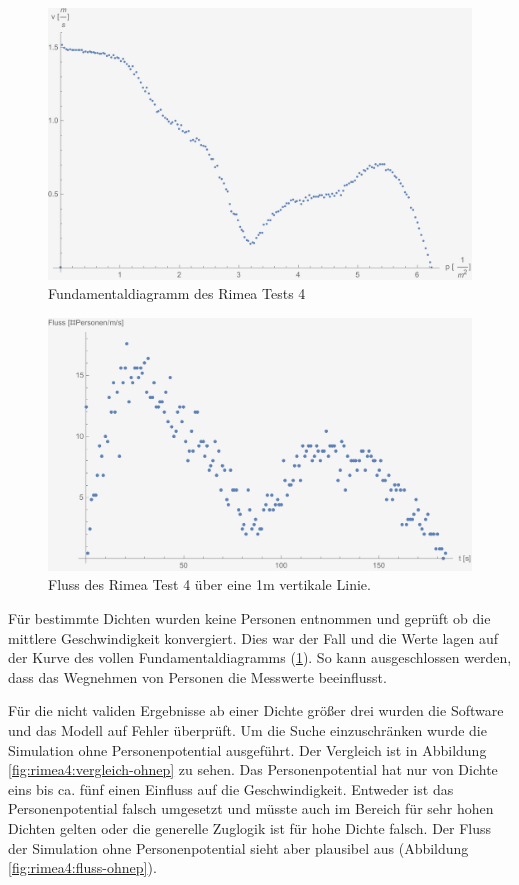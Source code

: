 \begin{figure}
	\centering
	\includegraphics[width=0.7\linewidth]{abbildungen/fundamentaldiagramm/diagramm}
	\caption{Fundamentaldiagramm des Rimea Tests 4}
	\label{fig:rimea4:diagramm}
\end{figure}

\begin{figure}
	\centering
	\includegraphics[width=0.7\linewidth]{abbildungen/fundamentaldiagramm/fluss}
	\caption{Fluss des Rimea Test 4 über eine 1m vertikale Linie.}
	\label{fig:rimea4:fluss}
\end{figure}

Für bestimmte Dichten wurden keine Personen entnommen und geprüft ob die mittlere Geschwindigkeit konvergiert. Dies war der Fall und die Werte lagen auf der Kurve des vollen Fundamentaldiagramms (\ref{fig:rimea4:diagramm}). So kann ausgeschlossen werden, dass das Wegnehmen von Personen die Messwerte beeinflusst.

Für die nicht validen Ergebnisse ab einer Dichte größer drei wurden die Software und das Modell auf Fehler überprüft. Um die Suche einzuschränken wurde die Simulation ohne Personenpotential ausgeführt. Der Vergleich ist in Abbildung \ref{fig:rimea4:vergleich-ohnep} zu sehen. Das Personenpotential hat nur von Dichte eins bis ca. fünf einen Einfluss auf die Geschwindigkeit.
Entweder ist das Personenpotential falsch umgesetzt und müsste auch im Bereich für sehr hohen Dichten gelten oder die generelle Zuglogik ist für hohe Dichte falsch. Der Fluss der Simulation ohne Personenpotential sieht aber plausibel aus (Abbildung \ref{fig:rimea4:fluss-ohnep}).

